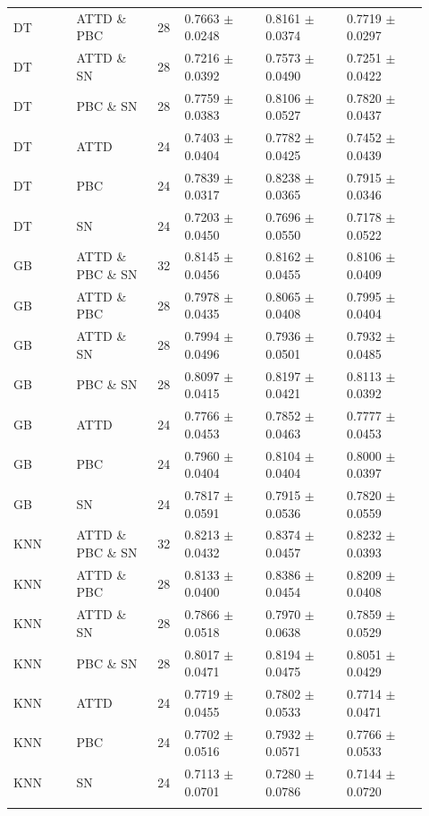 \documentclass[10pt,a4paper]{article}
\newcommand{\classifiersep}{\addlinespace[1pt]\midrule\addlinespace[1pt]}
\begin{document}
\begin{landscape}
\begin{longtable}{@{}L{0.14\linewidth}L{0.18\linewidth}C{0.06\linewidth}C{0.18\linewidth}C{0.18\linewidth}C{0.18\linewidth}@{}}
DT & ATTD \& PBC & 28 & 0.7663 $\pm$ 0.0248 & 0.8161 $\pm$ 0.0374 & 0.7719 $\pm$ 0.0297 \\
DT & ATTD \& SN & 28 & 0.7216 $\pm$ 0.0392 & 0.7573 $\pm$ 0.0490 & 0.7251 $\pm$ 0.0422 \\
DT & PBC \& SN & 28 & 0.7759 $\pm$ 0.0383 & 0.8106 $\pm$ 0.0527 & 0.7820 $\pm$ 0.0437 \\
DT & ATTD & 24 & 0.7403 $\pm$ 0.0404 & 0.7782 $\pm$ 0.0425 & 0.7452 $\pm$ 0.0439 \\
DT & PBC & 24 & 0.7839 $\pm$ 0.0317 & 0.8238 $\pm$ 0.0365 & 0.7915 $\pm$ 0.0346 \\
DT & SN & 24 & 0.7203 $\pm$ 0.0450 & 0.7696 $\pm$ 0.0550 & 0.7178 $\pm$ 0.0522 \\
\classifiersep
GB & ATTD \& PBC \& SN & 32 & 0.8145 $\pm$ 0.0456 & 0.8162 $\pm$ 0.0455 & 0.8106 $\pm$ 0.0409 \\
GB & ATTD \& PBC & 28 & 0.7978 $\pm$ 0.0435 & 0.8065 $\pm$ 0.0408 & 0.7995 $\pm$ 0.0404 \\
GB & ATTD \& SN & 28 & 0.7994 $\pm$ 0.0496 & 0.7936 $\pm$ 0.0501 & 0.7932 $\pm$ 0.0485 \\
GB & PBC \& SN & 28 & 0.8097 $\pm$ 0.0415 & 0.8197 $\pm$ 0.0421 & 0.8113 $\pm$ 0.0392 \\
GB & ATTD & 24 & 0.7766 $\pm$ 0.0453 & 0.7852 $\pm$ 0.0463 & 0.7777 $\pm$ 0.0453 \\
GB & PBC & 24 & 0.7960 $\pm$ 0.0404 & 0.8104 $\pm$ 0.0404 & 0.8000 $\pm$ 0.0397 \\
GB & SN & 24 & 0.7817 $\pm$ 0.0591 & 0.7915 $\pm$ 0.0536 & 0.7820 $\pm$ 0.0559 \\
\classifiersep
KNN & ATTD \& PBC \& SN & 32 & 0.8213 $\pm$ 0.0432 & 0.8374 $\pm$ 0.0457 & 0.8232 $\pm$ 0.0393 \\
KNN & ATTD \& PBC & 28 & 0.8133 $\pm$ 0.0400 & 0.8386 $\pm$ 0.0454 & 0.8209 $\pm$ 0.0408 \\
KNN & ATTD \& SN & 28 & 0.7866 $\pm$ 0.0518 & 0.7970 $\pm$ 0.0638 & 0.7859 $\pm$ 0.0529 \\
KNN & PBC \& SN & 28 & 0.8017 $\pm$ 0.0471 & 0.8194 $\pm$ 0.0475 & 0.8051 $\pm$ 0.0429 \\
KNN & ATTD & 24 & 0.7719 $\pm$ 0.0455 & 0.7802 $\pm$ 0.0533 & 0.7714 $\pm$ 0.0471 \\
KNN & PBC & 24 & 0.7702 $\pm$ 0.0516 & 0.7932 $\pm$ 0.0571 & 0.7766 $\pm$ 0.0533 \\
KNN & SN & 24 & 0.7113 $\pm$ 0.0701 & 0.7280 $\pm$ 0.0786 & 0.7144 $\pm$ 0.0720 \\
\classifiersep

\end{longtable}
\end{landscape}
\end{document}
